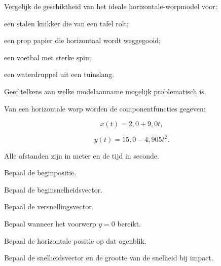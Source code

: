 \documentclass{ximera}
\begin{document}
\begin{oefening}{\oefU}

Vergelijk de geschiktheid van het ideale horizontale-worpmodel voor:

\begin{question}
een stalen knikker die van een tafel rolt;
\end{question}

\begin{question}
een prop papier die horizontaal wordt weggegooid;
\end{question}

\begin{question}
een voetbal met sterke spin;
\end{question}

\begin{question}
een waterdruppel uit een tuinslang.
\end{question}

Geef telkens aan welke modelaanname mogelijk problematisch is.

\end{oefening}




\begin{oefening}{\oefU\ESS}

Van een horizontale worp worden de componentfuncties gegeven:

\[
x(t)=2,0+9,0t,
\]

\[
y(t)=15,0-4,905t^2.
\]

Alle afstanden zijn in meter en de tijd in seconde.

\begin{question}
Bepaal de beginpositie.
\end{question}

\begin{question}
Bepaal de beginsnelheidsvector.
\end{question}

\begin{question}
Bepaal de versnellingsvector.
\end{question}

\begin{question}
Bepaal wanneer het voorwerp $y=0$ bereikt.
\end{question}

\begin{question}
Bepaal de horizontale positie op dat ogenblik.
\end{question}

\begin{question}
Bepaal de snelheidsvector en de grootte van de snelheid bij impact.
\end{question}

\end{oefening}
\end{document}
